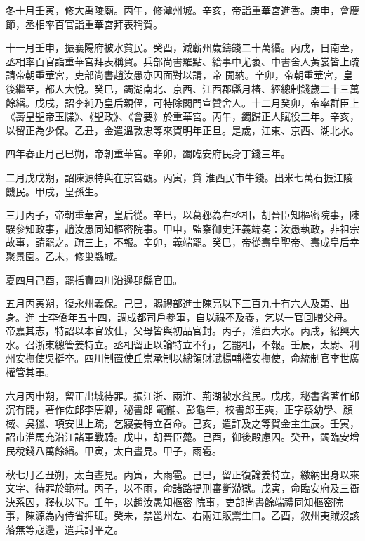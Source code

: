\begin{pinyinscope}
 冬十月壬寅，修大禹陵廟。丙午，修潭州城。辛亥，帝詣重華宮進香。庚申，會慶節，丞相率百官詣重華宮拜表稱賀。



 十一月壬申，振襄陽府被水貧民。癸酉，減蘄州歲鑄錢二十萬緡。丙戌，日南至，丞相率百官詣重華宮拜表稱賀。兵部尚書羅點、給事中尤袤、中書舍人黃裳皆上疏請帝朝重華宮，吏部尚書趙汝愚亦因面對以請，帝
 開納。辛卯，帝朝重華宮，皇後繼至，都人大悅。癸巳，蠲湖南北、京西、江西郡縣月樁、經總制錢歲二十三萬餘緡。戊戌，詔李純乃皇后親侄，可特除閣門宣贊舍人。十二月癸卯，帝率群臣上《壽皇聖帝玉牒》、《聖政》、《會要》於重華宮。丙午，蠲歸正人賦役三年。辛亥，以留正為少保。乙丑，金遣溫敦忠等來賀明年正旦。是歲，江東、京西、湖北水。



 四年春正月己巳朔，帝朝重華宮。辛卯，蠲臨安府民身丁錢三年。



 二月戊戌朔，詔陳源特與在京宮觀。丙寅，貸
 淮西民市牛錢。出米七萬石振江陵饑民。甲戌，皇孫生。



 三月丙子，帝朝重華宮，皇后從。辛巳，以葛邲為右丞相，胡晉臣知樞密院事，陳騤參知政事，趙汝愚同知樞密院事。甲申，監察御史汪義端奏：汝愚執政，非祖宗故事，請罷之。疏三上，不報。辛卯，義端罷。癸巳，帝從壽皇聖帝、壽成皇后幸聚景園。乙未，修巢縣城。



 夏四月己酉，罷括賣四川沿邊郡縣官田。



 五月丙寅朔，復永州義保。己巳，賜禮部進士陳亮以下三百九十有六人及第、出身。進
 士李僑年五十四，調成都司戶參軍，自以祿不及養，乞以一官回贈父母。帝嘉其志，特詔以本官致仕，父母皆與初品官封。丙子，淮西大水。丙戌，紹興大水。召浙東總管姜特立。丞相留正以論特立不行，乞罷相，不報。壬辰，太尉、利州安撫使吳挺卒。四川制置使丘崇承制以總領財賦楊輔權安撫使，命統制官李世廣權管其軍。



 六月丙申朔，留正出城待罪。振江浙、兩淮、荊湖被水貧民。戊戌，秘書省著作郎沉有開，著作佐郎李唐卿，秘書郎
 範黼、彭龜年，校書郎王奭，正字蔡幼學、顏棫、吳獵、項安世上疏，乞寢姜特立召命。己亥，遣許及之等賀金主生辰。壬寅，詔市淮馬充沿江諸軍戰騎。戊申，胡晉臣薨。己酉，御後殿慮囚。癸丑，蠲臨安增民稅錢八萬餘緡。甲寅，太白晝見。甲子，雨雹。



 秋七月乙丑朔，太白晝見。丙寅，大雨雹。己巳，留正復論姜特立，繳納出身以來文字、待罪於範村。丙子，以不雨，命諸路提刑審斷滯獄。戊寅，命臨安府及三衙決系囚，釋杖以下。壬午，以趙汝愚知樞密
 院事，吏部尚書餘端禮同知樞密院事，陳源為內侍省押班。癸未，禁邕州左、右兩江販鬻生口。乙酉，敘州夷賊沒該落無等寇邊，遣兵討平之。




\end{pinyinscope}
